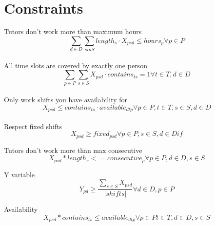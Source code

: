 \documentclass{article}
\begin{document}
\section*{Constraints}
Tutors don't work more than maximum hours
$$\sum_{d \in D} \sum_{s in S} length_s \cdot X_{psd} \leq hours_p \forall p \in P$$ \\

All time slots are covered by exactly one person %
$$\sum_{p \in P} \sum_{s \in S} X_{psd} \cdot contains_{ts} = 1 \forall t \in T, d \in D$$ \\

Only work shifts you have availability for %
$$X_{psd} \leq contains_{ts} \cdot available_{dtp} \forall p \in P, t \in T, s \in S, d \in D $$ \\

Respect fixed shifts
$$X_{psd} \geq fixed_{psd} \forall p \in P, s \in S, d \in D if $$

Tutors don't work more than max consecutive
$$ X_{psd} * length_{s} <= consecutive_{p} \forall p \in P, d \in D, s \in S$$

Y variable
$$Y_{pd} \geq \frac{\sum_{s \in S} X_{psd}}{|shifts|}  \forall d \in D, p \in P$$

Availability
$$X_{psd} * contains_{ts} \leq available_{dtp} \forall p \in P t \in T, d \in D, s \in S$$
\end{document}
